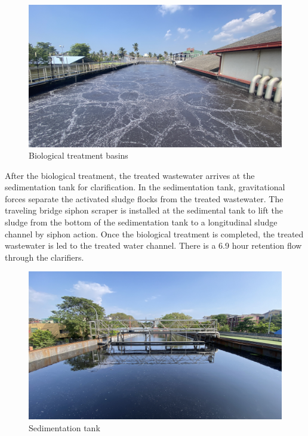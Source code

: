 \begin{figure}[H]
\centering
\includegraphics[width=0.98\linewidth]{material_and_methodology/Biological Treatment basins.JPG}
\caption{Biological treatment basins}
\label{fig:Biological_treatment_basins}
\end{figure}

After the biological treatment, the treated wastewater arrives at the sedimentation tank for clarification. In the sedimentation tank, gravitational forces separate the activated sludge flocks from the treated wastewater. The traveling bridge siphon scraper is installed at the sedimental tank to lift the sludge from the bottom of the sedimentation tank to a longitudinal sludge channel by siphon action. Once the biological treatment is completed, the treated wastewater is led to the treated water channel. There is a 6.9 \unit{hour} retention flow through the clarifiers.

\begin{figure}[H]
\centering
\includegraphics[width=0.98\linewidth]{material_and_methodology/Sedimentation basin.jpg}
\caption{Sedimentation tank}
\label{fig:Sedimentation_tank}
\end{figure}
